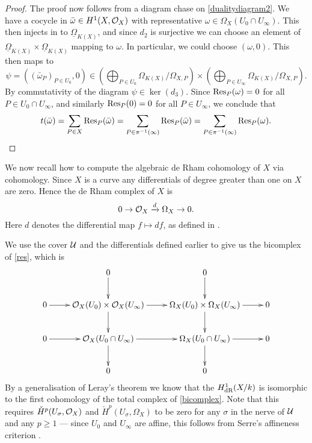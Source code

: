 \begin{proof}
    The proof now follows from a diagram chase on \eqref{dualitydiagram2}.
     We have a cocycle in $\bar \omega \in H^1(X,\mathcal{O}_X)$ with representative $\omega \in \Omega_X(U_0 \cap U_\infty)$.
    This then injects in to $\underline{\Omega}_{K(X)}$, and since $d_2$ is surjective we can choose an element of $\underline{\Omega}_{K(X)} \times \underline{\Omega}_{K(X)}$ mapping to $\omega$.
    In particular, we could choose $(\omega,0)$.
    This then maps to 
        \[
        \psi = ((\bar{\omega}_P)_{P\in U_0}, 0) \in \left( \bigoplus_{P \in U_0} \Omega_{K(X)}/\Omega_{X,P}\right) \times \left( \bigoplus_{P \in U_\infty} \Omega_{K(X)}/\Omega_{X,P} \right).
        \]
    By commutativity of the diagram $\psi \in \ker(d_3)$.
    Since $\operatorname{Res}_P(\omega)=0$ for all $P \in U_0 \cap U_\infty$, and similarly $\operatorname{Res}_P(0)=0$ for all $P \in U_\infty$, we conclude that 
        \[
        t(\bar \omega) = \sum_{P \in X}\operatorname{Res}_P(\bar \omega) = \sum_{P \in \pi^{-1}(\infty)} \operatorname{Res}_P(\bar \omega) = \sum_{P \in \pi^{-1}(\infty)} \operatorname{Res}_P(\omega).
        \]
    \end{proof}

We now recall how to compute the algebraic de Rham cohomology of $X$ via \cech cohomology.
Since $X$ is a curve any differentials of degree greater than one on $X$ are zero.
Hence the de Rham complex of $X$ is 
    \begin{equation}\label{res}
    0 \rightarrow {\cal O}_X \xrightarrow{d} \Omega_X \rightarrow 0.
    \end{equation}
Here $d$ denotes the differential map $f \mapsto df$, as defined in \cite[Chap. II, pg. 172]{hart}.

We use the cover $\cal U$ and the \cech differentials defined earlier to give us the \cech bicomplex of \eqref{res}, which is
    \begin{equation}\label{bicomplex}
    \xymatrix{ & 0 \ar[d] & 0 \ar[d] & \\
    0 \ar[r] & \cO_X(U_0) \times \cO_X(U_\infty) \ar[d] \ar[r] & \Omega_X(U_0) \times \Omega_X(U_\infty) \ar[d] \ar[r] & 0 \\
    0 \ar[r] & \cO_X(U_0\cap U_\infty) \ar[d] \ar[r] & \Omega_X(U_0 \cap U_\infty) \ar[r] \ar[d] & 0 \\
    & 0 & 0 &}
    \end{equation}
By a generalisation of Leray's theorem \cite[Cor. 12.4.7]{EGA0III} we know that the $H_{\text {dR}}^1(X/k)$ is isomorphic to the first cohomology of the total complex of \eqref{bicomplex}.
Note that this requires ${\check H}^p(U_\sigma, {\cal O}_X)$ and ${\check H}^p(U_\sigma, \Omega_X)$ to be zero for any $\sigma$ in the nerve of ${\mathcal U}$ and any $p \geq 1$ ---
since $U_0$ and $U_\infty$ are affine, this follows from Serre's affineness criterion \cite[Thm. 5.2.23]{liu}.



